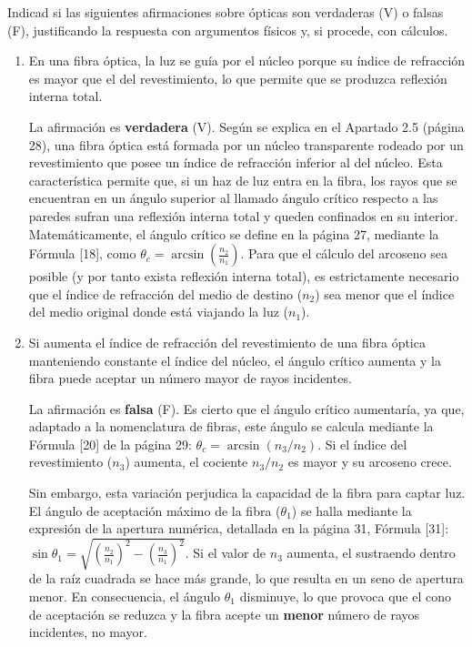 \documentclass[11pt, a4paper]{article}
\newenvironment{problem}[1][Cuestión]{
	\vspace{0.5cm}
	\noindent{\Large\bfseries #1} \par\vspace{0.5cm}
}{
	\vspace{0.5cm}
}
\begin{document}
	\begin{problem}[Cuestión 3]
	Indicad si las siguientes afirmaciones sobre ópticas son verdaderas (V) o falsas (F), justificando la respuesta con argumentos físicos y, si procede, con cálculos.

	\begin{enumerate}[label=\alph*)] 
		\item En una fibra óptica, la luz se guía por el núcleo porque su índice de refracción es mayor que el del revestimiento, lo que permite que se produzca reflexión interna total.

			{ \color{blue} 
				La afirmación es \textbf{verdadera} (V). Según se explica en el Apartado 2.5 (página 28), una fibra óptica está formada por un núcleo transparente rodeado por un revestimiento que posee un índice de refracción inferior al del núcleo. Esta característica permite que, si un haz de luz entra en la fibra, los rayos que se encuentran en un ángulo superior al llamado ángulo crítico respecto a las paredes sufran una reflexión interna total y queden confinados en su interior. Matemáticamente, el ángulo crítico se define en la página 27, mediante la Fórmula [18], como $\theta_c = \arcsin(\frac{n_2}{n_1})$. Para que el cálculo del arcoseno sea posible (y por tanto exista reflexión interna total), es estrictamente necesario que el índice de refracción del medio de destino ($n_2$) sea menor que el índice del medio original donde está viajando la luz ($n_1$).
			}

		\item Si aumenta el índice de refracción del revestimiento de una fibra óptica manteniendo constante el índice del núcleo, el ángulo crítico aumenta y la fibra puede aceptar un número mayor de rayos incidentes.

			{ \color{blue} 
				La afirmación es \textbf{falsa} (F). Es cierto que el ángulo crítico aumentaría, ya que, adaptado a la nomenclatura de fibras, este ángulo se calcula mediante la Fórmula [20] de la página 29: $\theta_c = \arcsin(n_3/n_2)$. Si el índice del revestimiento ($n_3$) aumenta, el cociente $n_3/n_2$ es mayor y su arcoseno crece. 

				Sin embargo, esta variación perjudica la capacidad de la fibra para captar luz. El ángulo de aceptación máximo de la fibra ($\theta_1$) se halla mediante la expresión de la apertura numérica, detallada en la página 31, Fórmula [31]: $\sin \theta_1 = \sqrt{\left (\frac{n_2}{n_1} \right)^2 - \left(\frac{n_3}{n_1} \right)^2}$. Si el valor de $n_3$ aumenta, el sustraendo dentro de la raíz cuadrada se hace más grande, lo que resulta en un seno de apertura menor. En consecuencia, el ángulo $\theta_1$ disminuye, lo que provoca que el cono de aceptación se reduzca y la fibra acepte un \textbf{menor} número de rayos incidentes, no mayor.
			}


\end{enumerate}
\end{problem}
\end{document}
